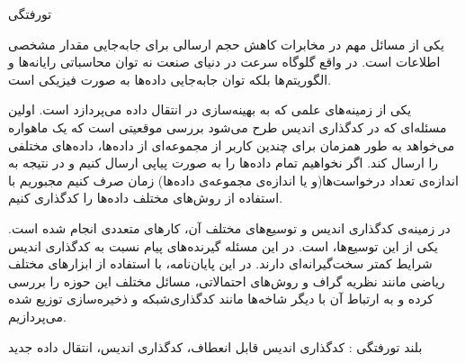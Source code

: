 


\begin{وسط‌چین}
\end{وسط‌چین}
‌تورفتگی

یکی از مسائل مهم در مخابرات کاهش حجم ارسالی برای جابه‌جایی مقدار مشخصی اطلاعات است. در واقع گلوگاه سرعت در دنیای صنعت نه توان محاسباتی رایانه‌ها و الگوریتم‌ها بلکه توان جابه‌جایی داده‌ها به صورت فیزیکی است.

یکی از زمینه‌های علمی که به بهینه‌سازی در انتقال داده می‌پردازد است. اولین مسئله‌ای که در کدگذاری اندیس طرح می‌شود بررسی موقعیتی است که یک ماهواره می‌خواهد به طور همزمان برای چندین کاربر از مجموعه‌ای از داده‌ها، داده‌های مختلفی را ارسال کند. اگر نخواهیم تمام داده‌ها را به صورت پیاپی ارسال کنیم و در نتیجه به اندازه‌ی تعداد درخواست‌ها(و یا اندازه‌ی مجموعه‌ی داده‌ها) زمان صرف کنیم مجبوریم با استفاده از روش‌های مختلف داده‌ها را کدگذاری کنیم.

در زمینه‌ی کدگذاری اندیس و توسیع‌های مختلف آن، کارهای متعددی انجام شده است. یکی از این توسیع‌ها، 
است. در این مسئله گیرنده‌های پیام نسبت به کدگذاری اندیس شرایط کمتر سخت‌گیرانه‌ای دارند. در این پایان‌‌نامه، با استفاده از ابزارهای مختلف ریاضی مانند نظریه گراف و روش‌های احتمالاتی، مسائل مختلف این حوزه را بررسی کرده و به ارتباط آن با دیگر شاخه‌ها مانند کدگذار‌ی‌شبکه و ذخیره‌سازی توزیع شده می‌پردازیم.

‌بلند
‌تورفتگی :
کدگذاری اندیس قابل انعطاف، کدگذاری اندیس، انتقال داده
‌جدید
